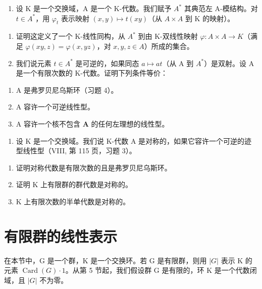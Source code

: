 \begin{enumerate}
\def\labelenumi{\arabic{enumi})}
\setcounter{enumi}{4}
\tightlist
\item
  设 K 是一个交换域，A 是一个 K-代数。我们赋予 \(A^{*}\) 其典范左 A-模结构。对 \(t \in A^{*}\)，用 \(\varphi_{t}\) 表示映射 \((x, y) \mapsto t(xy)\)（从 \(A \times A\) 到 K 的映射）。
\end{enumerate}

\begin{enumerate}
\def\labelenumi{\alph{enumi})}
\item
  证明这定义了一个 K-线性同构，从 \(A^{*}\) 到由 K-双线性映射 \(\varphi: A \times A \to K\)（满足 \(\varphi(xy, z) = \varphi(x, yz)\)，对 \(x, y, z \in A\)）所成的集合。
\item
  我们说元素 \(t \in A^{*}\) 是可逆的，如果同态 \(a \mapsto at\)（从 A 到 \(A^{*}\)）是双射。设 A 是一个有限次数的 K-代数。证明下列条件等价：
\end{enumerate}

\begin{enumerate}
\def\labelenumi{(\roman{enumi})}
\item
  A 是弗罗贝尼乌斯环（习题 4）。
\item
  A 容许一个可逆线性型。
\item
  A 容许一个核不包含 \(\mathbf{A}\) 的任何左理想的线性型。
\end{enumerate}

\begin{enumerate}
\def\labelenumi{\arabic{enumi})}
\setcounter{enumi}{5}
\tightlist
\item
  设 K 是一个交换域。我们说 K-代数 A 是对称的，如果它容许一个可逆的迹型线性型（VIII, 第 115 页，习题 3）。
\end{enumerate}

\begin{enumerate}
\def\labelenumi{\alph{enumi})}
\item
  证明对称代数是有限次数的且是弗罗贝尼乌斯环。
\item
  证明 \(\mathrm{K}\) 上有限群的群代数是对称的。
\item
  \(\mathrm{K}\) 上有限次数的半单代数是对称的。
\end{enumerate}

\section{有限群的线性表示}

在本节中，G 是一个群，K 是一个交换环。若 G 是有限群，则用 \(|G|\) 表示 K 的元素 \(\operatorname{Card}(G) \cdot 1\)。从第 5 节起，我们假设群 G 是有限的，环 K 是一个代数闭域，且 \(|G|\) 不为零。

